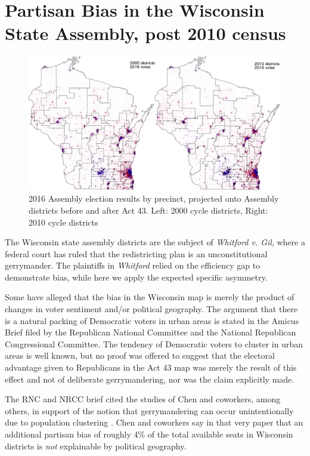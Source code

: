 \documentclass[preprint,12pt]{article}
\begin{document}
\section{Partisan Bias in the Wisconsin State Assembly, post 2010 census\label{sec:Wis}}

\begin{figure}[htb!]
    \begin{center}
        \includegraphics[scale=0.35]{../Figures/WI_compared/precincts_pop_combined.png}
        \caption{2016 Assembly election results by precinct, projected onto Assembly districts before and after Act 43. Left: 2000 cycle districts, Right: 2010 cycle districts}\label{fig:MapsWI}
    \end{center}
\end{figure}

The Wisconsin state assembly districts are the subject of \emph{Whitford v. Gil}, where a federal court has ruled that the redistricting plan is an unconstitutional gerrymander.
The plaintiffs in \emph{Whitford} relied on the efficiency gap to demonstrate bias, while here we apply the expected specific asymmetry.

Some have alleged that the bias in the Wisconsin map is merely the product of changes in voter sentiment and/or political geography.
The argument that there is a natural packing of Democratic voters in urban areas is stated in the Amicus Brief filed by the Republican National Committee and the National Republican Congressional Committee.
The tendency of Democratic voters to cluster in urban areas is well known, but no proof was offered to suggest that the electoral advantage given to Republicans in the Act 43 map was merely the result of this effect and not of deliberate gerrymandering, nor was the claim explicitly made.

The RNC and NRCC brief cited the studies of Chen and coworkers, among others, in support of the notion that gerrymandering can occur unintentionally due to population clustering \cite{Chen_2015_10.1089/elj.2015.0317,Chen_2016_10.1016/j.electstud.2016.06.014}.
Chen and coworkers say in that very paper that an additional partisan bias of roughly 4\% of the total available seats in Wisconsin districts is \emph{not} explainable by political geography.
\end{document}
